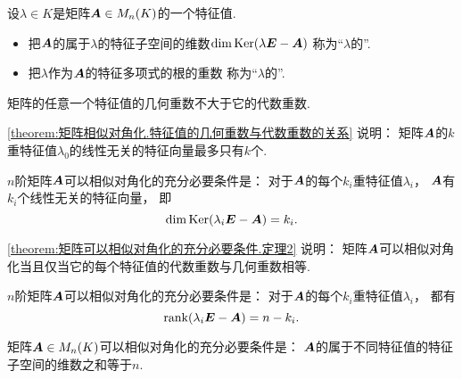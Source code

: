 \begin{definition}
设\(\lambda \in K\)是矩阵\(\boldsymbol{A} \in M_n(K)\)的一个特征值.
\begin{itemize}
	\item 把\(\boldsymbol{A}\)的属于\(\lambda\)的特征子空间的维数\(\dim\operatorname{Ker}(\lambda\boldsymbol{E}-\boldsymbol{A})\)
	称为“\(\lambda\)的”.
	\item 把\(\lambda\)作为\(\boldsymbol{A}\)的特征多项式的根的重数
	称为“\(\lambda\)的”.
\end{itemize}
\end{definition}
\begin{theorem}\label{theorem:矩阵相似对角化.特征值的几何重数与代数重数的关系}
矩阵的任意一个特征值的几何重数不大于它的代数重数.
\end{theorem}
\begin{remark}
\cref{theorem:矩阵相似对角化.特征值的几何重数与代数重数的关系} 说明：
矩阵\(\boldsymbol{A}\)的\(k\)重特征值\(\lambda_0\)的线性无关的特征向量最多只有\(k\)个.
\end{remark}

\begin{theorem}\label{theorem:矩阵可以相似对角化的充分必要条件.定理2}
\(n\)阶矩阵\(\boldsymbol{A}\)可以相似对角化的充分必要条件是：
对于\(\boldsymbol{A}\)的每个\(k_i\)重特征值\(\lambda_i\)，
\(\boldsymbol{A}\)有\(k_i\)个线性无关的特征向量，
即\[
	\dim\operatorname{Ker}(\lambda_i\boldsymbol{E}-\boldsymbol{A}) = k_i.
\]
\end{theorem}
\begin{remark}
\cref{theorem:矩阵可以相似对角化的充分必要条件.定理2} 说明：
矩阵\(\boldsymbol{A}\)可以相似对角化当且仅当它的每个特征值的代数重数与几何重数相等.
\end{remark}

\begin{corollary}\label{theorem:矩阵可以相似对角化的充分必要条件.定理3}
\(n\)阶矩阵\(\boldsymbol{A}\)可以相似对角化的充分必要条件是：
对于\(\boldsymbol{A}\)的每个\(k_i\)重特征值\(\lambda_i\)，
都有\[
	\rank(\lambda_i\boldsymbol{E}-\boldsymbol{A}) = n-k_i.
\]
\end{corollary}

\begin{theorem}\label{theorem:矩阵可以相似对角化的充分必要条件.定理4}
矩阵\(\boldsymbol{A} \in M_n(K)\)可以相似对角化的充分必要条件是：
\(\boldsymbol{A}\)的属于不同特征值的特征子空间的维数之和等于\(n\).
\end{theorem}

